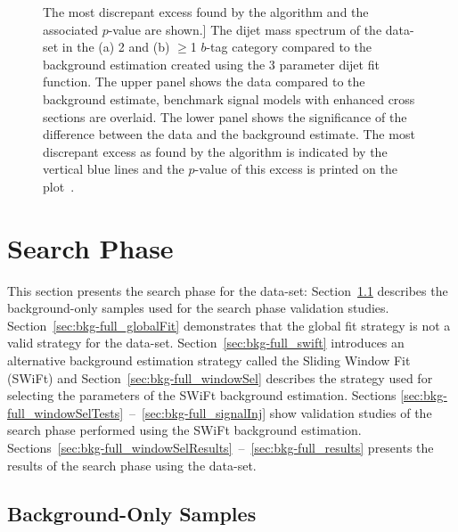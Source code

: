 \begin{figure}[!htb]
        The most discrepant excess found by the \bh{} algorithm and the associated \mbox{$p$-value} are shown.]        
      {The dijet mass spectrum of the  \summer{} data-set in the (a) 2 and (b) $\geq$1 $b$-tag category
        compared to the background estimation created using the 3 parameter dijet fit function.
        The upper panel shows the data compared to the background estimate,
        benchmark signal models with enhanced cross sections are overlaid.
        The lower panel shows the significance of the difference between the data and the background estimate.
        The most discrepant excess as found by the \bh{} algorithm is indicated by the vertical blue lines and the \mbox{$p$-value} of this excess is printed on the plot~\cite{dibjet-ichep_conf}.
          }
  \label{fig:bkg-summer_searchPhase}
\end{figure}

\clearpage
\section{\lm{} Search Phase}
\label{sec:bkg-full}

This section presents the search phase for the \lm{} data-set:
Section~\ref{sec:bkg-full_fitCR} describes the background-only samples used for the search phase validation studies.
Section~\ref{sec:bkg-full_globalFit} demonstrates that the global fit strategy is not a valid strategy for the \lm{} data-set.
Section~\ref{sec:bkg-full_swift} introduces an alternative background estimation strategy called the Sliding Window Fit (SWiFt)
and Section~\ref{sec:bkg-full_windowSel} describes the strategy used for selecting the parameters of the SWiFt background estimation.
Sections \ref{sec:bkg-full_windowSelTests}~--~\ref{sec:bkg-full_signalInj} show validation studies
of the search phase performed using the SWiFt background estimation.
Sections~\ref{sec:bkg-full_windowSelResults}~--~\ref{sec:bkg-full_results} presents the results of the search phase using the \lm{} data-set.

\subsection{Background-Only Samples}
\label{sec:bkg-full_fitCR}


